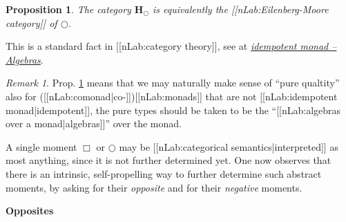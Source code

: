 \documentclass[12pt,titlepage]{article}
\theoremstyle{plain}
\newtheorem{prop}{Proposition}
\theoremstyle{definition}
\theoremstyle{remark}
\newtheorem{remark}{Remark}
\begin{document}
\begin{prop}
\label{bigcircpureObjectsAreEMObjects}\hypertarget{bigcircpureObjectsAreEMObjects}{}
The category $\mathbf{H}_{\bigcirc}$ is equivalently the [[nLab:Eilenberg-Moore category]] of $\bigcirc$.

\end{prop}
This is a standard fact in [[nLab:category theory]], see at \emph{\href{idempotent+monad#AlgebrasForAnIdempotentMonad}{idempotent monad -- Algebras}}.

\begin{remark}
\label{PurityForNonIdempotent}\hypertarget{PurityForNonIdempotent}{}
Prop. \ref{bigcircpureObjectsAreEMObjects} means that we may naturally make sense of ``pure qualtity'' also for ([[nLab:comonad|co-]])[[nLab:monads]] that are not [[nLab:idempotent monad|idempotent]], the pure types should be taken to be the ``[[nLab:algebras over a monad|algebras]]'' over the monad.

\end{remark}
A single moment $\Box$ or $\bigcirc$ may be [[nLab:categorical semantics|interpreted]] as most anything, since it is not further determined yet. One now observes that there is an intrinsic, self-propelling way to further determine such abstract moments, by asking for their \emph{opposite} and for their \emph{negative} moments.

\textbf{Opposites}
\end{document}
